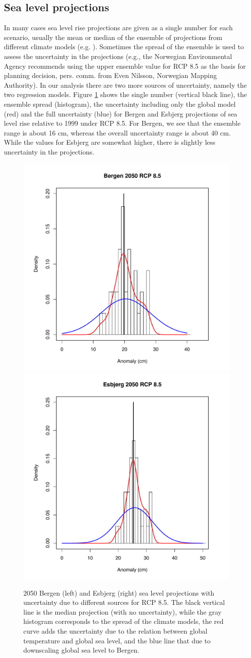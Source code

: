 \documentclass[note,screen,british,11pt]{nrdoc}
\begin{document}
\subsection{Sea level projections}

In many cases sea level rise projections are given as a single number for each scenario, usually the mean or median of the ensemble of projections from different climate models (e.g. \citet{climateimpactgroup}). Sometimes the spread of the ensemble is used to assess the uncertainty in the projections (e.g., the Norwegian Environmental Agency recommends using the upper ensemble value for RCP 8.5 as the basis for planning decision, pers. comm. from Even Nilsson, Norwegian Mapping Authority). In our analysis there are two more sources of uncertainty, namely the two regression models. Figure \ref{fig:unc} shows the single number (vertical black line), the ensemble spread (histogram), the uncertainty including only the global model (red) and the full uncertainty (blue) for Bergen and Esbjerg projections of sea level rise relative to 1999 under RCP 8.5. For Bergen, we see that the ensemble range is about 16 cm, whereas the overall uncertainty range is about 40 cm. While the values for Esbjerg are somewhat higher, there is slightly less uncertainty in the projections. 


\begin{figure}[!hbpt]
\begin{center}
  \includegraphics[width=0.45\linewidth]{unc.pdf}
  \includegraphics[width=0.45\linewidth]{ExbjergUncertainty.pdf}
\caption{2050 Bergen (left) and Esbjerg (right) sea level projections with uncertainty due to different sources for RCP 8.5. The black vertical line is the median projection (with no uncertainty), while the gray histogram corresponds to the spread of the climate models, the red curve adds the uncertainty due to the relation between global temperature and global sea level, and the blue line that due to downscaling global sea level to Bergen. } 
\label{fig:unc}
\end{center}
\end{figure}
\end{document}

